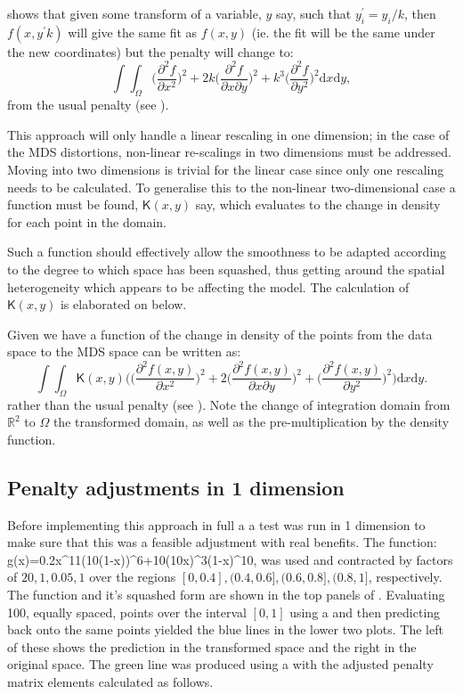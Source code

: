 \cite{wood2000} shows that given some transform of a variable, $y$ say, such that $y_i^\prime=y_i/k$, then $f(x,y^\prime k)$ will give the same fit as $f(x,y)$ (ie. the fit will be the same under the new coordinates) but the penalty will change to:
\begin{equation}
\int\int_\Omega \Big( \frac{\partial^2 f}{\partial x^2} \Big)^2 + 2k\Big( \frac{\partial^2 f}{\partial x \partial y} \Big)^2 + k^3\Big( \frac{\partial^2 f}{\partial y^2} \Big)^2 \text{d}x \text{d}y,
\label{adjustedintegral}
\end{equation}
from the usual \tprs penalty (see ).

This approach will only handle a linear rescaling in one dimension; in the case of the MDS distortions, non-linear re-scalings in two dimensions must be addressed. Moving into two dimensions is trivial for the linear case since only one rescaling needs to be calculated. To generalise this to the non-linear two-dimensional case a function must be found, $\mathsf{K}(x,y)$ say, which evaluates to the change in density for each point in the domain. 

Such a function should effectively allow the smoothness to be adapted according to the degree to which space has been squashed, thus getting around the spatial heterogeneity which appears to be affecting the model. The calculation of $\mathsf{K}(x,y)$ is elaborated on below.

Given we have a function of the change in density of the points from the data space to the MDS space  can be written as:
\begin{equation}
\int\int_\Omega \mathsf{K}(x,y) \Big( \Big(\frac{\partial^2 f(x,y)}{\partial x^2}\Big)^2 + 2\Big(\frac{\partial^2 f(x,y)}{\partial x \partial y}\Big)^2 + \Big(\frac{\partial^2 f(x,y)}{\partial y^2}\Big)^2\Big) \text{d}x\text{d}y.
\label{kdeadjust}
\end{equation}
rather than the usual \tprs penalty (see ). Note the change of integration domain from $\mathbb{R}^2$ to $\Omega$ the transformed domain, as well as the pre-multiplication by the density function.

\subsection{Penalty adjustments in 1 dimension}

Before implementing this approach in full a a test was run in 1 dimension to make sure that this was a feasible adjustment with real benefits. The function:
\be
g(x)=0.2x^{11}(10(1-x))^6+10(10x)^3(1-x)^{10},
\label{hardfcn}
\ee
was used and contracted by factors of $20,1,0.05,1$ over the regions $[0,0.4], (0.4,0.6],(0.6,0.8],(0.8,1]$, respectively. The function and it's squashed form are shown in the top panels of . Evaluating 100, equally spaced, points over the interval $[0,1]$ using a \tprs and then predicting back onto the same points yielded the blue lines in the lower two plots. The left of these shows the prediction in the transformed space and the right in the original space. The green line was produced using a \tprs with the adjusted penalty matrix elements calculated as follows.

